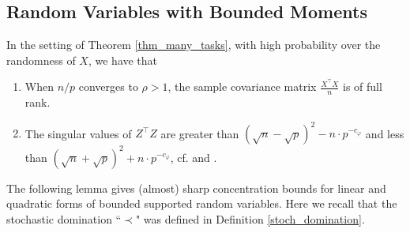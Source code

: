 \subsection{Random Variables with Bounded Moments}

\begin{fact}\label{fact_minv}
	In the setting of Theorem \ref{thm_many_tasks}, with high probability over the randomness of $X$, we have that
	\begin{enumerate}
		\item When $n / p$ converges to $\rho > 1$, the sample covariance matrix $\frac{X^{\top}X}{n}$ is of full rank.
		\item The singular values of $Z^{\top}Z$ are greater than $(\sqrt{n} - \sqrt{p})^2 - n \cdot p^{-c_{\varphi}}$ and less than $(\sqrt{n} + \sqrt{p})^2 + n \cdot p^{-c_{\varphi}}$, cf. \citet[Theorem 2.10]{isotropic} and \citet[Lemma 3.12]{DY}.
	\end{enumerate}
\end{fact}

The following lemma gives (almost) sharp concentration bounds for linear and quadratic forms of bounded supported random variables. Here we recall that the stochastic domination ``$\prec$" was defined in Definition \ref{stoch_domination}.

